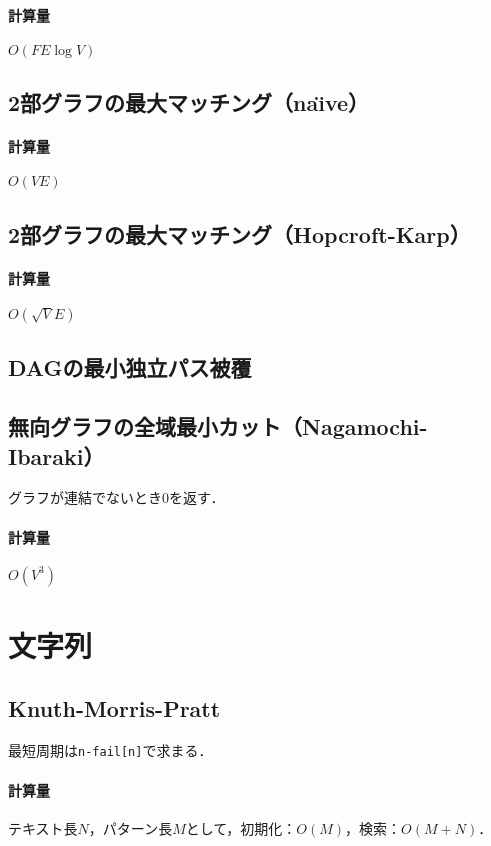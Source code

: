 \documentclass[landscape,twocolumn,9pt]{jsarticle}
\begin{document}
\paragraph{計算量} $O(FE\log V)$


\subsection{2部グラフの最大マッチング（na\"\i ve）}
\paragraph{計算量} $O(VE)$


\subsection{2部グラフの最大マッチング（Hopcroft-Karp）}
\paragraph{計算量} $O(\sqrt{V}E)$


\subsection{DAGの最小独立パス被覆}


\subsection{無向グラフの全域最小カット（Nagamochi-Ibaraki）}
グラフが連結でないとき0を返す．
\paragraph{計算量} $O(V^3)$


\section{文字列}%
\subsection{Knuth-Morris-Pratt}
最短周期は\texttt{n-fail[n]}で求まる．

\paragraph{計算量} テキスト長$N$，パターン長$M$として，初期化：$O(M)$，検索：$O(M+N)$．

\end{document}
